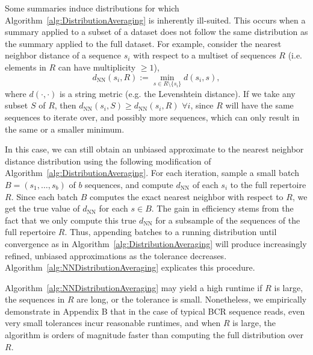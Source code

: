 \documentclass{article}
\begin{document}
Some summaries induce distributions for which Algorithm~\ref{alg:DistributionAveraging} is inherently ill-suited.
This occurs when a summary applied to a subset of a dataset does not follow the same distribution as the summary applied to the full dataset.
For example, consider the nearest neighbor distance of a sequence $s_i$ with respect to a multiset of sequences $R$ (i.e. elements in $R$ can have multiplicity $\ge 1$),
\begin{equation}
d_\text{NN}(s_i, R) := \min_{s \in R \setminus \{s_i\}} d(s_i, s),
\end{equation}
where $d(\cdot, \cdot)$ is a string metric (e.g. the Levenshtein distance).
If we take any subset $S$ of $R$, then $d_\text{NN}(s_i, S) \ge d_\text{NN}(s_i, R)$ $\forall i$, since $R$ will have the same sequences to iterate over, and possibly more sequences, which can only result in the same or a smaller minimum.


In this case, we can still obtain an unbiased approximate to the nearest neighbor distance distribution using the following modification of Algorithm~\ref{alg:DistributionAveraging}.
For each iteration, sample a small batch $B = (s_1, \dotsc, s_b)$ of $b$ sequences, and compute $d_\text{NN}$ of each $s_i$ to the full repertoire $R$.
Since each batch $B$ computes the exact nearest neighbor with respect to $R$, we get the true value of $d_\text{NN}$ for each $s \in B$.
The gain in efficiency stems from the fact that we only compute this true $d_\text{NN}$ for a subsample of the sequences of the full repertoire $R$.
Thus, appending batches to a running distribution until convergence as in Algorithm~\ref{alg:DistributionAveraging} will produce increasingly refined, unbiased approximations as the tolerance decreases.
Algorithm~\ref{alg:NNDistributionAveraging} explicates this procedure.

Algorithm~\ref{alg:NNDistributionAveraging} may yield a high runtime if $R$ is large, the sequences in $R$ are long, or the tolerance is small.
Nonetheless, we empirically demonstrate in Appendix B that in the case of typical BCR sequence reads, even very small tolerances incur reasonable runtimes, and when $R$ is large, the algorithm is orders of magnitude faster than computing the full distribution over $R$.
\end{document}
